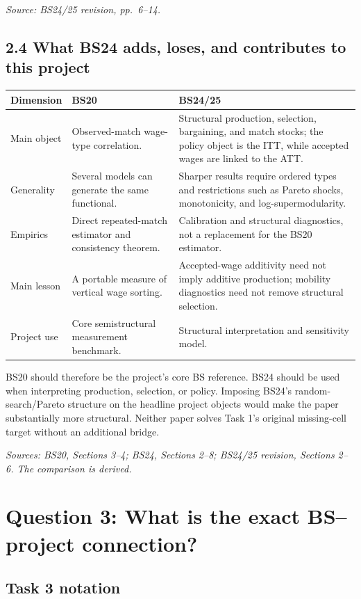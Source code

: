 \documentclass[11pt]{article}
\begin{document}
\textit{Source: BS24/25 revision, pp.\ 6--14.}

\subsection{2.4 What BS24 adds, loses, and contributes to this project}

\begin{longtable}{p{}p{}p{}}
\textbf{Dimension} & \textbf{BS20} & \textbf{BS24/25} \\
\hline
Main object & Observed-match wage-type correlation. & Structural production,
selection, bargaining, and match stocks; the policy object is the ITT, while
accepted wages are linked to the ATT. \\
Generality & Several models can generate the same functional. & Sharper
results require ordered types and restrictions such as Pareto shocks,
monotonicity, and log-supermodularity. \\
Empirics & Direct repeated-match estimator and consistency theorem. &
Calibration and structural diagnostics, not a replacement for the BS20
estimator. \\
Main lesson & A portable measure of vertical wage sorting. & Accepted-wage
additivity need not imply additive production; mobility diagnostics need not
remove structural selection. \\
Project use & Core semistructural measurement benchmark. & Structural
interpretation and sensitivity model. \\
\end{longtable}

BS20 should therefore be the project's core BS reference.  BS24 should be
used when interpreting production, selection, or policy.  Imposing BS24's
random-search/Pareto structure on the headline project objects would make the
paper substantially more structural.  Neither paper solves Task 1's original
missing-cell target without an additional bridge.

\textit{Sources: BS20, Sections 3--4; BS24, Sections 2--8; BS24/25 revision,
Sections 2--6.  The comparison is derived.}

\section{Question 3: What is the exact BS--project connection?}

\subsection{Task 3 notation}
\end{document}
